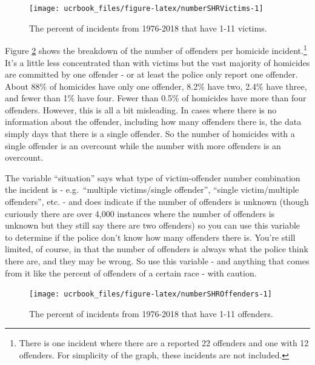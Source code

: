 \documentclass[
  12pt,
  openany]{book}
\begin{document}
\begin{figure}

{\centering \texttt{[image: ucrbook\_files/figure-latex/numberSHRVictims-1]} 

}

\caption{The percent of incidents from 1976-2018 that have 1-11 victims.}\label{fig:numberSHRVictims}
\end{figure}

Figure \ref{fig:numberSHROffenders} shows the breakdown of the number of offenders per homicide incident.\footnote{There is one incident where there are a reported 22 offenders and one with 12 offenders. For simplicity of the graph, these incidents are not included.} It's a little less concentrated than with victims but the vast majority of homicides are committed by one offender - or at least the police only report one offender. About 88\% of homicides have only one offender, 8.2\% have two, 2.4\% have three, and fewer than 1\% have four. Fewer than 0.5\% of homicides have more than four offenders. However, this is all a bit misleading. In cases where there is no information about the offender, including how many offenders there is, the data simply days that there is a single offender. So the number of homicides with a single offender is an overcount while the number with more offenders is an overcount.

The variable ``situation'' says what type of victim-offender number combination the incident is - e.g.~``multiple victims/single offender'', ``single victim/multiple offenders'', etc. - and does indicate if the number of offenders is unknown (though curiously there are over 4,000 instances where the number of offenders is unknown but they still say there are two offenders) so you can use this variable to determine if the police don't know how many offenders there is. You're still limited, of course, in that the number of offenders is always what the police think there are, and they may be wrong. So use this variable - and anything that comes from it like the percent of offenders of a certain race - with caution.

\begin{figure}

{\centering \texttt{[image: ucrbook\_files/figure-latex/numberSHROffenders-1]} 

}

\caption{The percent of incidents from 1976-2018 that have 1-11 offenders.}\label{fig:numberSHROffenders}
\end{figure}
\end{document}
